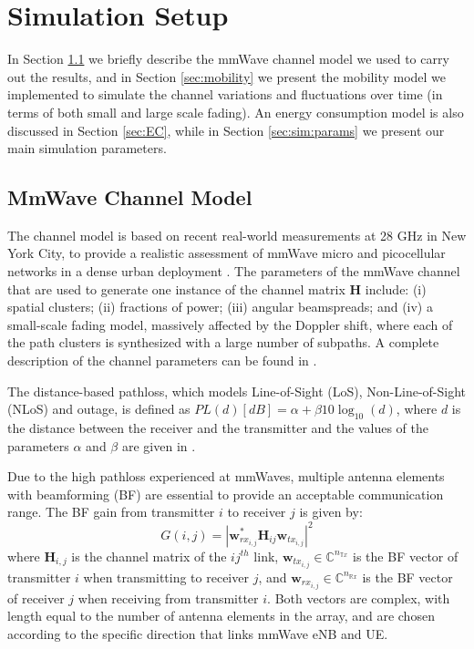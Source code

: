 \documentclass[conference]{IEEEtran}
\begin{document}
\section{Simulation Setup}
\label{sec:sim_setup}
In  Section \ref{sec:channel} we briefly describe the mmWave channel model we used to carry out the results, and in Section \ref{sec:mobility} we present the mobility model we implemented to simulate the channel variations and fluctuations over time (in terms of both small and large scale fading). An energy consumption model is also discussed in Section \ref{sec:EC}, while in Section \ref{sec:sim:params} we present our main simulation parameters.

\subsection{MmWave Channel Model}
\label{sec:channel}
The channel model is based on recent real-world measurements at 28 GHz in New York
City, to provide a realistic assessment of mmWave micro and picocellular networks in a dense
urban deployment \cite{Mustafa,MacCartney2015Wideband,samimi2015chanmod}. 
The parameters of the mmWave channel that are
used to generate one instance of the channel matrix \textbf{H} include: (i) spatial clusters; (ii) fractions of power; (iii) angular beamspreads; and
(iv) a small-scale fading model, massively affected by the Doppler shift, where each of the path clusters is synthesized with a large number of subpaths. A complete description of the channel parameters can be found in \cite{Mustafa,giordani2016uplink}.

The distance-based pathloss, which models Line-of-Sight (LoS), Non-Line-of-Sight (NLoS) and outage, is defined as
$PL(d)[dB] = \alpha + \beta 10 \log_{10}(d)$,
where $d$ is the distance between the receiver and the transmitter and the values of the parameters $\alpha$ and $\beta$ are given in \cite{Mustafa}.

Due to the high pathloss experienced at mmWaves, multiple antenna elements with beamforming (BF) are essential to provide an acceptable  communication range. The BF gain from transmitter $i$ to receiver $j$ is  given by:
\begin{equation}
G({{i,j}}) = |\textbf{w}^*_{rx_{i,j}}\textbf{H}_{ij}\textbf{w}_{tx_{i,j}}|^2
\label{beamforming_gain}
\end{equation}
where $\textbf{H}_{i,j}$ is the channel matrix of the $ij^{th}$ link, $\textbf{w}_{tx_{i,j}}\in \mathbb{C}^{n_{\mathbb{T}x}}$ is the BF vector of transmitter $i$ when transmitting to receiver $j$, and $\textbf{w}_{rx_{i,j}}\in \mathbb{C}^{n_{\mathbb{R}x}}$ is the BF vector of receiver $j$ when receiving from transmitter $i$.  Both vectors are complex, with length equal to the number of antenna elements in the array, and are chosen according to the specific direction that links mmWave eNB and UE.
\end{document}
